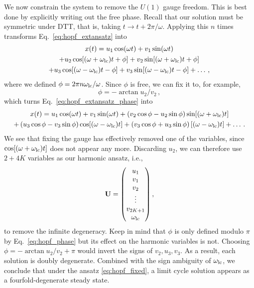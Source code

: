 We now constrain the system to remove the $U(1)$ gauge freedom. This is best done by explicitly writing out the free phase. Recall that our solution must be symmetric under DTT, that is, taking $t \rightarrow t + 2\pi/\omega$. Applying this $n$ times transforms Eq.~\eqref{eq:hopf_extansatz} into
\begin{multline} \label{eq:hopf_extansatz_phase}
x(t) = u_1 \cos(\omega t) + v_1 \sin(\omega t) 
\\ +  u_2 \cos[(\omega + \omega_{\rm lc}) t + \phi] + v_2 \sin[(\omega + \omega_{\rm lc}) t + \phi] 
\\ + u_3 \cos[(\omega - \omega_{\rm lc}) t - \phi] + v_3 \sin[(\omega - \omega_{\rm lc}) t - \phi]+ \ldots \,,
\end{multline}
where we defined $\phi = 2\pi n \omega_{\rm lc} / \omega$. Since $\phi$ is free, we can fix it to, for example,
\begin{equation} \label{eq:hopf_phase}
\phi = -\arctan{u_2/v_2}\,,
\end{equation}
which turns Eq.~\eqref{eq:hopf_extansatz_phase} into
\begin{multline}
x(t) = u_1 \cos(\omega t) + v_1 \sin(\omega t) + \left( v_2 \cos{\phi} - u_2 \sin{\phi} \right) \sin[(\omega + \omega_{\rm lc}) t] \\ 
+ \left( u_3 \cos{\phi} - v_3 \sin{\phi} \right) \cos[(\omega - \omega_{\rm lc}) t]  + \left(v_3 \cos{\phi} + u_3 \sin{\phi} \right) [(\omega - \omega_{\rm lc}) t]  + \ldots \,. 
\end{multline}
We see that fixing the gauge has effectively removed one of the variables, since $\cos[(\omega + \omega_{\rm lc}) t]$ does not appear any more. Discarding $u_2$, we can therefore use $2+4K$ variables as our harmonic ansatz, i.e.,
\begin{equation} \label{eq:hopf_fixed}
\vb{U}= \mqty(u_1 \\ v_1 \\ v_2 \\ \vdots \\ v_{2K+1} \\ \omega_{\rm lc}) \,,
\end{equation}
to remove the infinite degeneracy. Keep in mind that $\phi$ is only defined modulo $\pi$ by Eq.~\eqref{eq:hopf_phase} but its effect on the harmonic variables is not. Choosing $\phi = -\arctan{u_2/v_2} + \pi$ would invert the signs of $v_2, u_3, v_3$. As a result, each solution is doubly degenerate. Combined with the sign ambiguity of $\omega_{\rm lc}$, we conclude that under the ansatz \eqref{eq:hopf_fixed}, a limit cycle solution appears as a fourfold-degenerate steady state.

